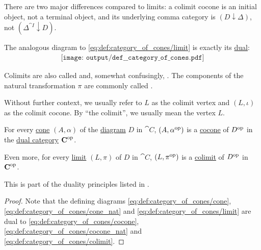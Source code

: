 \begin{definition}
\begin{thmenum}
    There are two major differences compared to limits: a colimit cocone is an initial object, not a terminal object, and its underlying comma category is \( (D \downarrow \Delta) \), not \( (\Delta^{\cat{I}} \downarrow D) \).

    The analogous diagram to \eqref{eq:def:category_of_cones/limit} is exactly its \hyperref[thm:categorical_principle_of_duality]{dual}:
    \begin{equation}\label{eq:def:category_of_cones/colimit}
      \begin{aligned}
        \texttt{[image: output/def\_\_category\_of\_cones.pdf]}
      \end{aligned}
    \end{equation}

    Colimits are also called  and, somewhat confusingly, . The components of the natural transformation \( \pi \) are commonly called .


    Without further context, we usually refer to \( L \) as the colimit vertex and \( (L, \iota) \) as the colimit cocone. By \enquote{the colimit}, we usually mean the vertex \( L \).
  \end{thmenum}
\end{definition}

\begin{proposition}\label{thm:categorical_limit_duality}
  For every \hyperref[def:category_of_cones/cone]{cone} \( (A, \alpha) \) of the \hyperref[def:categorical_diagram]{diagram} \( D \) in \( \cat{C} \), \( (A, \alpha^{\operatorname{op}}) \) is a \hyperref[def:category_of_cones/cone]{cocone} of \( D^{\operatorname{op}} \) in the \hyperref[def:dual_category]{dual category} \( \operatorname{\mathbf{C}}^{\operatorname{op}} \).

  Even more, for every \hyperref[def:category_of_cones/limit]{limit} \( (L, \pi) \) of \( D \) in \( \cat{C} \), \( (L, \pi^{\operatorname{op}}) \) is a \hyperref[def:category_of_cones/colimit]{colimit} of \( D^{\operatorname{op}} \) in \( \operatorname{\mathbf{C}}^{\operatorname{op}} \).

  This is part of the duality principles listed in .
\end{proposition}
\begin{proof}
  Note that the defining diagrams \eqref{eq:def:category_of_cones/cone}, \eqref{eq:def:category_of_cones/cone_nat} and \eqref{eq:def:category_of_cones/limit} are dual to \eqref{eq:def:category_of_cones/cocone}, \eqref{eq:def:category_of_cones/cocone_nat} and \eqref{eq:def:category_of_cones/colimit}.
\end{proof}

